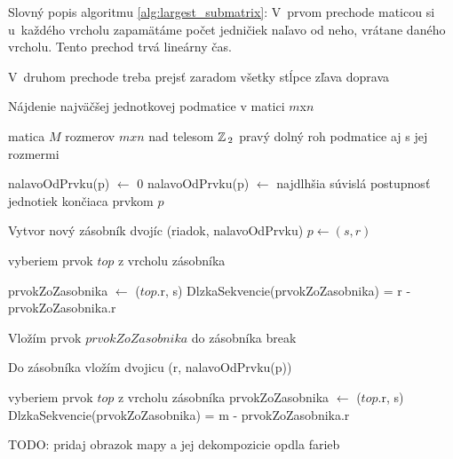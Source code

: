 Slovný popis algoritmu \ref{alg:largest_submatrix}: 
V~prvom prechode maticou si u~každého vrcholu zapamätáme počet jedničiek naľavo od neho, vrátane daného vrcholu. 
Tento prechod trvá lineárny čas.

V~druhom prechode treba prejsť zaradom všetky stĺpce zľava doprava



\begin{algorithm}
\caption{Nájdenie najväčšej jednotkovej podmatice v matici  $m$x$n$}
\label{alg:largest_submatrix}
\begin{algorithmic}[1] %
\REQUIRE matica $M$ rozmerov $m x n$ nad telesom $\mathbb{Z}\,_2$
\ENSURE pravý dolný roh podmatice aj s jej rozmermi


		\STATE nalavoOdPrvku(p) $\leftarrow$ 0
	\ELSE
		\STATE nalavoOdPrvku(p) $\leftarrow$ najdlhšia súvislá postupnosť jednotiek končiaca prvkom $p$
	\ENDIF	
\ENDFOR

	\STATE Vytvor nový zásobník dvojíc (riadok, nalavoOdPrvku)
		\STATE $p \leftarrow (s, r)$
		
			\STATE vyberiem prvok $top$ z vrcholu zásobníka
						
				\STATE prvokZoZasobnika $\leftarrow$ ($top$.r, s)
				\STATE DlzkaSekvencie(prvokZoZasobnika) = r - prvokZoZasobnika.r
			
			\ELSE
				\STATE Vložím prvok $prvokZoZasobnika$ do zásobníka
				\STATE break
			\ENDIF
		\ENDWHILE
		
		\STATE Do zásobníka vložím dvojicu (r, nalavoOdPrvku(p))
	\ENDFOR
	
		\STATE vyberiem prvok $top$ z vrcholu zásobníka
		\STATE prvokZoZasobnika $\leftarrow$ ($top$.r, s)
		\STATE DlzkaSekvencie(prvokZoZasobnika) = m - prvokZoZasobnika.r
		
	\ENDWHILE
\ENDFOR




\end{algorithmic}
\end{algorithm}



TODO: pridaj obrazok mapy a jej dekompozicie opdla farieb